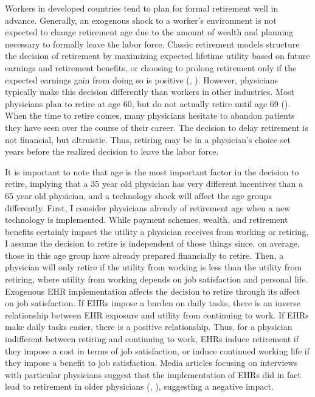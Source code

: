\documentclass[11pt]{article}
\begin{document}
Workers in developed countries tend to plan for formal retirement well in advance. Generally, an exogenous shock to a worker's environment is not expected to change retirement age due to the amount of wealth and planning necessary to formally leave the labor force. Classic retirement models structure the decision of retirement by maximizing expected lifetime utility based on future earnings and retirement benefits, or choosing to prolong retirement only if the expected earnings gain from doing so is positive (\cite{gustman1986disaggregated}, \cite{stock1990pension}). However, physicians typically make this decision differently than workers in other industries. Most physicians plan to retire at age 60, but do not actually retire until age 69 (\cite{collier2017challenges}). When the time to retire comes, many physicians hesitate to abandon patients they have seen over the course of their career. The decision to delay retirement is not financial, but altruistic. Thus, retiring may be in a physician's choice set years before the realized decision to leave the labor force. 

It is important to note that age is the most important factor in the decision to retire, implying that a 35 year old physician has very different incentives than a 65 year old physician, and a technology shock will affect the age groups differently. First, I consider physicians already of retirement age when a new technology is implemented. While payment schemes, wealth, and retirement benefits certainly impact the utility a physician receives from working or retiring, I assume the decision to retire is independent of those things since, on average, those in this age group have already prepared financially to retire. Then, a physician will only retire if the utility from working is less than the utility from retiring, where utility from working depends on job satisfaction and personal life. Exogenous EHR implementation affects the decision to retire through its affect on job satisfaction. If EHRs impose a burden on daily tasks, there is an inverse relationship between EHR exposure and utility from continuing to work. If EHRs make daily tasks easier, there is a positive relationship. Thus, for a physician indifferent between retiring and continuing to work, EHRs induce retirement if they impose a cost in terms of job satisfaction, or induce continued working life if they impose a benefit to job satisfaction. Media articles focusing on interviews with particular physicians suggest that the implementation of EHRs did in fact lead to retirement in older physicians (\cite{ringel_2019}, \cite{loria_2020}), suggesting a negative impact. 
\end{document}
